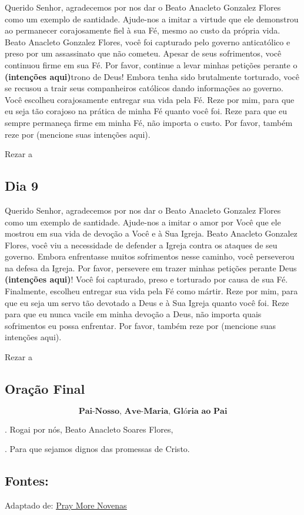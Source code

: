 \documentclass[a4paper,14pt,twoside]{extarticle} \usepackage[utf8]{inputenc}
\makeatletter
\newcommand{\vers@resp@sym}{%
  \raisebox{0.2ex}{\rotatebox[origin=c]{-20}{$\m@th\rceil$}}%
}
\newcommand{\vers@resp}[2]{%
  {\ooalign{%
     \hidewidth\kern#1\vers@resp@sym\hidewidth\cr
     #2\cr
  }}%
}
\DeclareRobustCommand{\versicle}{\vers@resp{-0.1em}{\textbf{V}}}
\DeclareRobustCommand{\response}{\vers@resp{0pt}{\textbf{R}}}
\makeatother
\begin{document}
Querido Senhor, agradecemos por nos dar o Beato Anacleto Gonzalez Flores como um exemplo de santidade. Ajude-nos a imitar a virtude que ele demonstrou ao permanecer corajosamente fiel à sua Fé, mesmo ao custo da própria vida. Beato Anacleto Gonzalez Flores, você foi capturado pelo governo anticatólico e preso por um assassinato que não cometeu. Apesar de seus sofrimentos, você continuou firme em sua Fé. Por favor, continue a levar minhas petições perante o  \textbf{(intenções aqui)}trono de Deus! Embora tenha sido brutalmente torturado, você se recusou a trair seus companheiros católicos dando informações ao governo. Você escolheu corajosamente entregar sua vida pela Fé. Reze por mim, para que eu seja tão corajoso na prática de minha Fé quanto você foi. Reze para que eu sempre permaneça firme em minha Fé, não importa o custo. Por favor, também reze por (mencione suas intenções aqui). 

Rezar a \textbf{}

\subsection{Dia 9}

Querido Senhor, agradecemos por nos dar o Beato Anacleto Gonzalez Flores como um exemplo de santidade. Ajude-nos a imitar o amor por Você que ele mostrou em sua vida de devoção a Você e à Sua Igreja. Beato Anacleto Gonzalez Flores, você viu a necessidade de defender a Igreja contra os ataques de seu governo. Embora enfrentasse muitos sofrimentos nesse caminho, você perseverou na defesa da Igreja. Por favor, persevere em trazer minhas petições perante Deus \textbf{(intenções aqui)}! Você foi capturado, preso e torturado por causa de sua Fé. Finalmente, escolheu entregar sua vida pela Fé como mártir. Reze por mim, para que eu seja um servo tão devotado a Deus e à Sua Igreja quanto você foi. Reze para que eu nunca vacile em minha devoção a Deus, não importa quais sofrimentos eu possa enfrentar. Por favor, também reze por (mencione suas intenções aqui). 

Rezar a \textbf{}

\subsection{Oração Final}\label{sub:Oração Final} %

\[
  \textbf{Pai-Nosso, Ave-Maria, Glória ao Pai}
\]

\versicle. Rogai por nós, Beato Anacleto Soares Flores,

\response. Para que sejamos dignos das promessas de Cristo.

\vfill

\begin{center}
\subsection*{Fontes:}
Adaptado de: 
\underline{\href{https://www.praymorenovenas.com/blessed-anacleto-gonzalez-flores-novena}{Pray More Novenas}}
\end{center}
\end{document}
